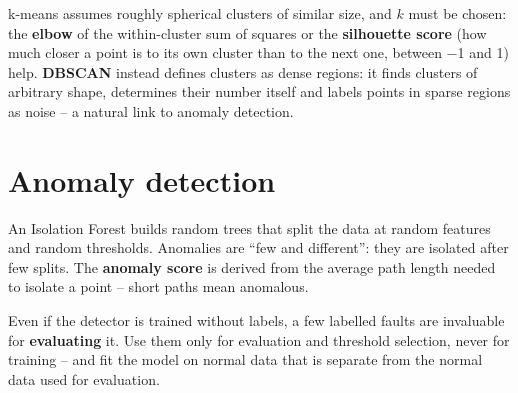 \documentclass[
  letterpaper,
  DIV=11,
  numbers=noendperiod]{scrreprt}
\begin{document}
k-means assumes roughly spherical clusters of similar size, and \(k\)
must be chosen: the \textbf{elbow} of the within-cluster sum of squares
or the \textbf{silhouette score} (how much closer a point is to its own
cluster than to the next one, between −1 and 1) help. \textbf{DBSCAN}
instead defines clusters as dense regions: it finds clusters of
arbitrary shape, determines their number itself and labels points in
sparse regions as noise -- a natural link to anomaly detection.

\section{Anomaly detection}\label{anomaly-detection}

\begin{tcolorbox}[enhanced jigsaw, left=2mm, title=\textcolor{quarto-callout-note-color}{\faInfo}\hspace{0.5em}{Definition: Isolation Forest}, opacityback=0, breakable, rightrule=.15mm, arc=.35mm, toptitle=1mm, colbacktitle=quarto-callout-note-color!10!white, opacitybacktitle=0.6, coltitle=black, colframe=quarto-callout-note-color-frame, bottomrule=.15mm, leftrule=.75mm, bottomtitle=1mm, titlerule=0mm, toprule=.15mm, colback=white]

An Isolation Forest builds random trees that split the data at random
features and random thresholds. Anomalies are ``few and different'':
they are isolated after few splits. The \textbf{anomaly score} is
derived from the average path length needed to isolate a point -- short
paths mean anomalous.

\end{tcolorbox}

\begin{tcolorbox}[enhanced jigsaw, left=2mm, title=\textcolor{quarto-callout-tip-color}{\faLightbulb}\hspace{0.5em}{Engineering practice: evaluating unsupervised detectors}, opacityback=0, breakable, rightrule=.15mm, arc=.35mm, toptitle=1mm, colbacktitle=quarto-callout-tip-color!10!white, opacitybacktitle=0.6, coltitle=black, colframe=quarto-callout-tip-color-frame, bottomrule=.15mm, leftrule=.75mm, bottomtitle=1mm, titlerule=0mm, toprule=.15mm, colback=white]

Even if the detector is trained without labels, a few labelled faults
are invaluable for \textbf{evaluating} it. Use them only for evaluation
and threshold selection, never for training -- and fit the model on
normal data that is separate from the normal data used for evaluation.

\end{tcolorbox}
\end{document}

